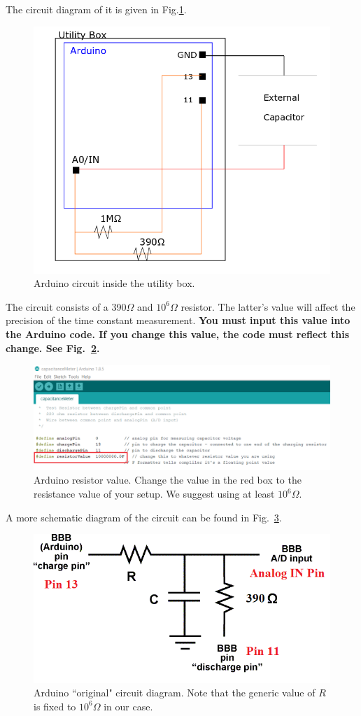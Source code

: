 \documentclass[12pt]{report}
\begin{document}
\begin{appendix}
The circuit diagram of it is given in Fig.\ref{Fig:App-Arduino-utility-box}.
\begin{figure}[h]
\centering
\includegraphics[width=0.6 \textwidth]{lab1-arduino-utility-box.png}
\caption{Arduino circuit inside the utility box.}
\label{Fig:App-Arduino-utility-box}
\end{figure}
The circuit consists of a 390$\Omega$ and $10^6\Omega$ resistor. The latter's value will affect the precision of the time constant measurement.
\textbf{You must input this value into the Arduino code. If you change this value, the code must reflect this change. See Fig.~\ref{Fig:ArduinoResistance}.}
\begin{figure}[h]
\centering
\includegraphics[width=0.9 \textwidth]{lab1-Arduino-resistance.png}
\caption{Arduino resistor value. Change the value in the red box to the resistance value of your setup. We suggest using at least $10^6 \Omega$.}
\label{Fig:ArduinoResistance}
\end{figure}

A more schematic diagram of the circuit can be found in Fig.~\ref{Fig:ArduinoSchem}.
\begin{figure}[H]
\centering
\includegraphics[scale=0.85]{CapacitanceMeterSchem.png}
\caption{Arduino ``original" circuit diagram. Note that the generic value of $R$ is fixed to $10^6\Omega$ in our case.}
\label{Fig:ArduinoSchem}
\end{figure}


\end{appendix}
\end{document}
